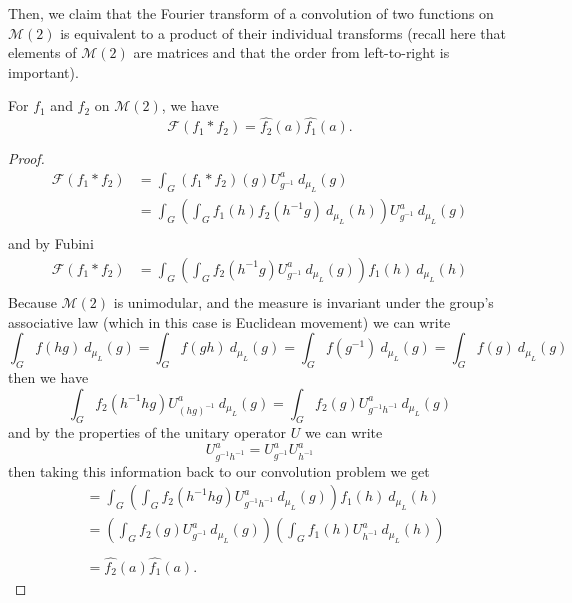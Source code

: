 \documentclass{article}
\begin{document}
Then, we claim that the Fourier transform of a convolution of two functions on $\mathcal{M}(2)$ is equivalent to a product of their individual transforms (recall here that elements of $\mathcal{M}(2)$ are matrices and that the order from left-to-right is important).
\begin{theorem}
    For $f_1$ and $f_2$ on $\mathcal{M}(2)$, we have
    \[%
        \mathcal{F}(f_1 * f_2) = \hat{f_2}(a) \hat{f_1}(a)
    .\]%
\end{theorem}

\begin{proof}
    \[%
        \begin{split}
            \mathcal{F}(f_1 * f_2) &= \int_{G} (f_1 * f_2)(g) U^{a}_{g^{-1}} \ d_{\mu_{L}}(g) \\
                                   &= \int_{G} \left( \int_{G} 
                                       f_1(h) f_2(h^{-1}g) 
                                       \ d_{\mu_{L}}(h) \right) U^{a}_{g^{-1}}\ d_{\mu_{L}}(g) \\
        \end{split} 
    \]%
    and by Fubini
    \[%
         \begin{split}
            \mathcal{F}(f_1 * f_2) 
                                   &= \int_{G} \left( \int_{G} 
                                       f_2(h^{-1}g) U^{a}_{g^{-1}}\ d_{\mu_{L}}(g)\right) 
                                       f_1(h) \ d_{\mu_{L}}(h)  \\
        \end{split} 
    \]%
    Because $\mathcal{M}(2)$ is unimodular, and the measure is invariant under the group's associative law (which in this case is Euclidean movement) we can write
    \[%
        \int_{G} f(hg) \ d_{\mu_{L}}(g) =
        \int_{G} f(gh) \ d_{\mu_{L}}(g) =
        \int_{G} f(g^{-1}) \ d_{\mu_{L}}(g) =
        \int_{G} f(g) \ d_{\mu_{L}}(g)
    \]%
    then we have
    \[%
        \int_{G} f_2(h^{-1}hg) U^{a}_{(hg)^{-1}}\ d_{\mu_{L}}(g) =
        \int_{G} f_2(g) U^{a}_{g^{-1}h^{-1}}\ d_{\mu_{L}}(g) 
    \]%
    and by the properties of the unitary operator $U$ we can write
    \[%
        U^{a}_{g^{-1}h^{-1}} = U^{a}_{g^{-1}} U^{a}_{h^{-1}}
    \]%
    then taking this information back to our convolution problem we get
    \[%
        \begin{split}
           &= \int_{G} 
           \left( \int_{G} f_2(h^{-1}hg) U^{a}_{g^{-1}h^{-1}}\ d_{\mu_{L}}(g)\right) 
               f_1(h) \ d_{\mu_{L}}(h)  \\
            &= 
               \left( \int_{G} f_2(g) U^{a}_{g^{-1}}\ d_{\mu_{L}}(g)\right) 
               \left(\int_{G} f_1(h) U^{a}_{h^{-1}}\ d_{\mu_{L}}(h)\right)  \\
            \\
            &= \hat{f_2}(a) \hat{f_1}(a).
        \end{split} 
    \]%
\end{proof}




\end{document}
